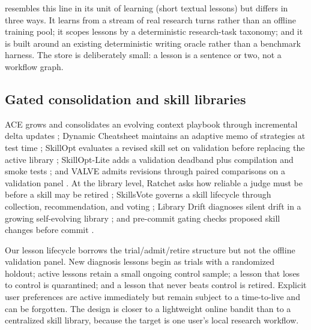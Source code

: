 \system{} resembles this line in its unit of learning (short textual lessons) but differs in three ways. It learns from a stream of real research turns rather than an offline training pool; it scopes lessons by a deterministic research-task taxonomy; and it is built around an existing deterministic writing oracle rather than a benchmark harness. The store is deliberately small: a lesson is a sentence or two, not a workflow graph.

\subsection{Gated consolidation and skill libraries}
ACE grows and consolidates an evolving context playbook through incremental delta updates \citep{zhang2026agentic}; Dynamic Cheatsheet maintains an adaptive memo of strategies at test time \citep{suzgun2026dynamic}; SkillOpt evaluates a revised skill set on validation before replacing the active library \citep{yang2026skillopt}; SkillOpt-Lite adds a validation deadband plus compilation and smoke tests \citep{shen2026skilloptlite}; and VALVE admits revisions through paired comparisons on a validation panel \citep{wang2026valve}. At the library level, Ratchet asks how reliable a judge must be before a skill may be retired \citep{zhang2026ratchet}; SkillsVote governs a skill lifecycle through collection, recommendation, and voting \citep{liu2026skillsvote}; Library Drift diagnoses silent drift in a growing self-evolving library \citep{zhang2026librarydrift}; and pre-commit gating checks proposed skill changes before commit \citep{shang2026backfires}.

Our lesson lifecycle borrows the trial/admit/retire structure but not the offline validation panel. New diagnosis lessons begin as trials with a randomized holdout; active lessons retain a small ongoing control sample; a lesson that loses to control is quarantined; and a lesson that never beats control is retired. Explicit user preferences are active immediately but remain subject to a time-to-live and can be forgotten. The design is closer to a lightweight online bandit than to a centralized skill library, because the target is one user's local research workflow.

